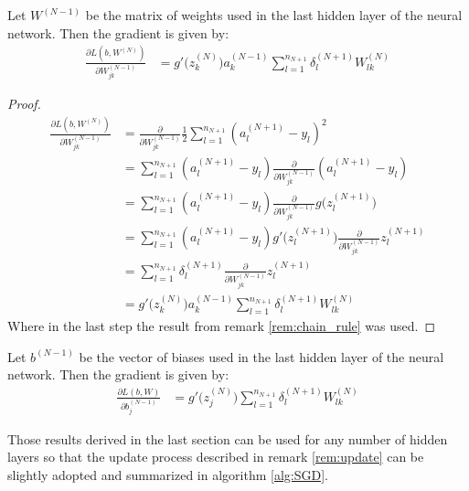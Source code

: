 \begin{remark}
		Let $W^{(N-1)}$ be the matrix of weights used in the last hidden layer of the neural network. Then the gradient is given by: 		
		\begin{align*} %
		\frac{\partial L(b,W^{(N)})}{\partial W_{jk}^{(N-1)}} 
		&= g'\big( z_k^{(N)}\big) a_k^{(N-1)} \sum_{l = 1}^{n_{N+1}} \delta_l^{(N+1)} W_{lk}^{(N)} 
		\end{align*}		
		
		\begin{proof}
			\begin{align*} %
			\frac{\partial L(b,W^{(N)})}{\partial W_{jk}^{(N-1)}} 
			&= \frac{\partial}{\partial W_{jk}^{(N-1)}} \frac{1}{2} \sum_{l = 1}^{n_{N+1}} (a_l^{(N+1)} - y_l)^2  \\
			&= \sum_{l = 1}^{n_{N+1}} (a_l^{(N+1)} - y_l) \frac{\partial}{\partial W_{jk}^{(N-1)}} (a_l^{(N+1)} - y_l) \\
			&= \sum_{l = 1}^{n_{N+1}} (a_l^{(N+1)} - y_l) \frac{\partial}{\partial W_{jk}^{(N-1)}} g\big(z_l^{(N+1)} \big) \\
			&= \sum_{l = 1}^{n_{N+1}} (a_l^{(N+1)} - y_l) g'\big(z_l^{(N+1)} \big) \frac{\partial}{\partial W_{jk}^{(N-1)}} z_l^{(N+1)} \\
			&= \sum_{l = 1}^{n_{N+1}} \delta_l^{(N+1)} \frac{\partial}{\partial W_{jk}^{(N-1)}} z_l^{(N+1)} \\
			&= g'\big( z_k^{(N)}\big) a_k^{(N-1)} \sum_{l = 1}^{n_{N+1}} \delta_l^{(N+1)} W_{lk}^{(N)} 
			\end{align*}
			Where in the last step the result from remark \ref{rem:chain_rule} was used. 
		\end{proof}
\end{remark}

\begin{remark}
		Let $b^{(N-1)}$ be the vector of biases used in the last hidden layer of the neural network. Then the gradient is given by:
		\begin{align*} %
			\frac{\partial L(b,W)}{\partial b_j^{(N-1)}} 
			&= g'\big( z_j^{(N)}\big) \sum_{l = 1}^{n_{N+1}} \delta_l^{(N+1)} W_{lk}^{(N)} 
		\end{align*}		
\end{remark}
Those results derived in the last section can be used for any number of hidden layers so that the update process described in remark \ref{rem:update} can be slightly adopted and summarized in algorithm \ref{alg:SGD}. 

